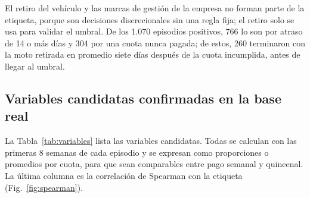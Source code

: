 \documentclass[journal]{IEEEtran}
\begin{document}
El retiro del vehículo y las marcas de gestión de la empresa no forman parte de la etiqueta, porque son decisiones discrecionales sin una regla fija; el retiro solo se usa para validar el umbral. De los 1.070 episodios positivos, 766 lo son por atraso de 14 o más días y 304 por una cuota nunca pagada; de estos, 260 terminaron con la moto retirada en promedio siete días después de la cuota incumplida, antes de llegar al umbral.

\subsection{Variables candidatas confirmadas en la base real}

La Tabla~\ref{tab:variables} lista las variables candidatas. Todas se calculan con las primeras 8 semanas de cada episodio y se expresan como proporciones o promedios por cuota, para que sean comparables entre pago semanal y quincenal. La última columna es la correlación de Spearman con la etiqueta (Fig.~\ref{fig:spearman}).
\end{document}

